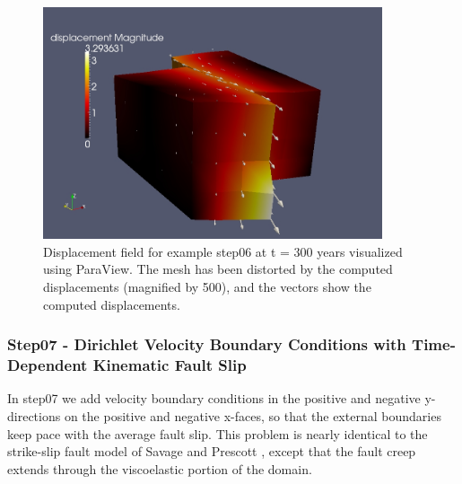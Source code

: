 \begin{figure}
  \includegraphics[width=10cm]{examples/figs/3dhex8_step06-displ-t300}
  \caption{Displacement field for example step06 at t = 300 years visualized
    using ParaView. The mesh has been distorted by the computed displacements
    (magnified by 500), and the vectors show the computed displacements.}
  \label{fig:example:3dhex8:step06:displacement}
\end{figure}


\subsubsection{Step07 - Dirichlet Velocity Boundary Conditions with Time-Dependent Kinematic Fault Slip}

In step07 we add velocity boundary conditions in the positive and
negative y-directions on the positive and negative x-faces, so that
the external boundaries keep pace with the average fault slip. This
problem is nearly identical to the strike-slip fault model of Savage
and Prescott \cite{Savage:Prescott:1978}, except that the fault creep
extends through the viscoelastic portion of the domain.

